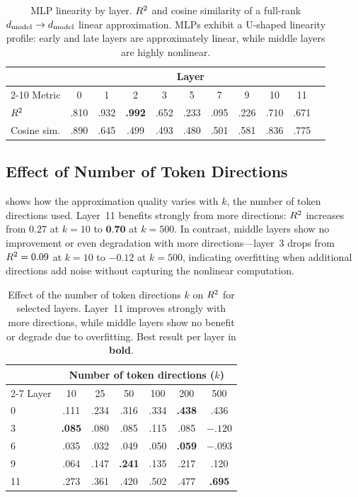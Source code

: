 \begin{table}[t]
    \centering
    \caption{MLP linearity by layer. $R^2$ and cosine similarity of a full-rank $d_{\text{model}} \to d_{\text{model}}$ linear approximation. MLPs exhibit a U-shaped linearity profile: early and late layers are approximately linear, while middle layers are highly nonlinear.}
    \label{tab:linearity}
    \begin{tabular}{@{}lcccccccccc@{}}
        \toprule
        & \multicolumn{9}{c}{Layer} \\
        \cmidrule(lr){2-10}
        Metric & 0 & 1 & 2 & 3 & 5 & 7 & 9 & 10 & 11 \\
        \midrule
        $R^2$ & .810 & .932 & \textbf{.992} & .652 & .233 & .095 & .226 & .710 & .671 \\
        Cosine sim. & .890 & .645 & .499 & .493 & .480 & .501 & .581 & .836 & .775 \\
        \bottomrule
    \end{tabular}
\end{table}

\subsection{Effect of Number of Token Directions}
\label{sec:res_topk}

 shows how the approximation quality varies with $k$, the number of token directions used.
Layer~11 benefits strongly from more directions: $R^2$ increases from $0.27$ at $k=10$ to $\textbf{0.70}$ at $k=500$.
In contrast, middle layers show no improvement or even degradation with more directions---layer~3 drops from $R^2 = 0.09$ at $k=10$ to $-0.12$ at $k=500$, indicating overfitting when additional directions add noise without capturing the nonlinear computation.

\begin{table}[t]
    \centering
    \caption{Effect of the number of token directions $k$ on $R^2$ for selected layers. Layer~11 improves strongly with more directions, while middle layers show no benefit or degrade due to overfitting. Best result per layer in \textbf{bold}.}
    \label{tab:topk}
    \begin{tabular}{@{}lcccccc@{}}
        \toprule
        & \multicolumn{6}{c}{Number of token directions ($k$)} \\
        \cmidrule(lr){2-7}
        Layer & 10 & 25 & 50 & 100 & 200 & 500 \\
        \midrule
        0 & .111 & .234 & .316 & .334 & \textbf{.438} & .436 \\
        3 & \textbf{.085} & .080 & .085 & .115 & .085 & $-.120$ \\
        6 & .035 & .032 & .049 & .050 & \textbf{.059} & $-.093$ \\
        9 & .064 & .147 & \textbf{.241} & .135 & .217 & .120 \\
        11 & .273 & .361 & .420 & .502 & .477 & \textbf{.695} \\
        \bottomrule
    \end{tabular}
\end{table}

